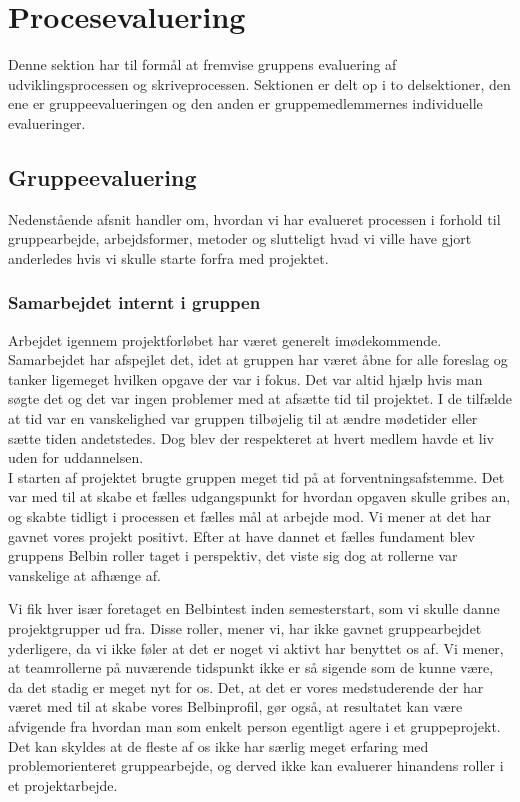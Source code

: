 \section{Procesevaluering}
Denne sektion har til formål at fremvise gruppens evaluering af udviklingsprocessen og skriveprocessen. Sektionen er delt op i to delsektioner, den ene er gruppeevalueringen og den anden er gruppemedlemmernes individuelle evalueringer. 

\subsection{Gruppeevaluering}
Nedenstående afsnit handler om, hvordan vi har evalueret processen i forhold til gruppearbejde, arbejdsformer, metoder og slutteligt hvad vi ville have gjort anderledes hvis vi skulle starte forfra med projektet.

\subsubsection{Samarbejdet internt i gruppen}
Arbejdet igennem projektforløbet har været generelt imødekommende. Samarbejdet har afspejlet det, idet at gruppen har været åbne for alle foreslag og tanker ligemeget hvilken opgave der var i fokus. Det var altid hjælp hvis man søgte det og det var ingen problemer med at afsætte tid til projektet. I de tilfælde at tid var en vanskelighed var gruppen tilbøjelig til at ændre mødetider eller sætte tiden andetstedes. Dog blev der respekteret at hvert medlem havde et liv uden for uddannelsen.\\

I starten af projektet brugte gruppen meget tid på at forventningsafstemme. Det var med til at skabe et fælles udgangspunkt for hvordan opgaven skulle gribes an, og skabte tidligt i processen et fælles mål at arbejde mod. Vi mener at det har gavnet vores projekt positivt. Efter at have dannet et fælles fundament blev gruppens Belbin roller taget i perspektiv, det viste sig dog at rollerne var vanskelige at afhænge af.

Vi fik hver især foretaget en Belbintest inden semesterstart, som vi skulle danne projektgrupper ud fra. Disse roller, mener vi, har ikke gavnet gruppearbejdet yderligere, da vi ikke føler at det er noget vi aktivt har benyttet os af. Vi mener, at teamrollerne på nuværende tidspunkt ikke er så sigende som de kunne være, da det stadig er meget nyt for os. Det, at det er vores medstuderende der har været med til at skabe vores Belbinprofil, gør også, at resultatet kan være afvigende fra hvordan man som enkelt person egentligt agere i et gruppeprojekt. Det kan skyldes at de fleste af os ikke har særlig meget erfaring med problemorienteret gruppearbejde, og derved ikke kan evaluerer hinandens roller i et projektarbejde. 

